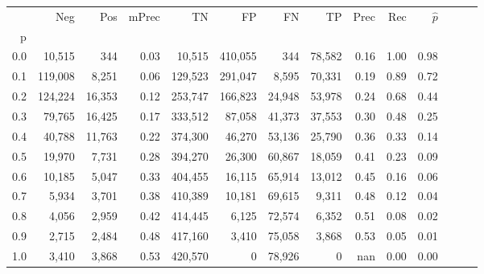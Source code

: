\begin{tabular}{rrrrrrrrrrrrrr}
\toprule
{} &      Neg &     Pos & mPrec &       TN &       FP &      FN &      TP &  Prec &   Rec & $\hat{p}$ \\
p   &          &         &       &          &          &         &         &       &       &           \\
\midrule
0.0 &   10,515 &     344 &  0.03 &   10,515 &  410,055 &     344 &  78,582 &  0.16 &  1.00 &      0.98 \\
0.1 &  119,008 &   8,251 &  0.06 &  129,523 &  291,047 &   8,595 &  70,331 &  0.19 &  0.89 &      0.72 \\
0.2 &  124,224 &  16,353 &  0.12 &  253,747 &  166,823 &  24,948 &  53,978 &  0.24 &  0.68 &      0.44 \\
0.3 &   79,765 &  16,425 &  0.17 &  333,512 &   87,058 &  41,373 &  37,553 &  0.30 &  0.48 &      0.25 \\
0.4 &   40,788 &  11,763 &  0.22 &  374,300 &   46,270 &  53,136 &  25,790 &  0.36 &  0.33 &      0.14 \\
0.5 &   19,970 &   7,731 &  0.28 &  394,270 &   26,300 &  60,867 &  18,059 &  0.41 &  0.23 &      0.09 \\
0.6 &   10,185 &   5,047 &  0.33 &  404,455 &   16,115 &  65,914 &  13,012 &  0.45 &  0.16 &      0.06 \\
0.7 &    5,934 &   3,701 &  0.38 &  410,389 &   10,181 &  69,615 &   9,311 &  0.48 &  0.12 &      0.04 \\
0.8 &    4,056 &   2,959 &  0.42 &  414,445 &    6,125 &  72,574 &   6,352 &  0.51 &  0.08 &      0.02 \\
0.9 &    2,715 &   2,484 &  0.48 &  417,160 &    3,410 &  75,058 &   3,868 &  0.53 &  0.05 &      0.01 \\
1.0 &    3,410 &   3,868 &  0.53 &  420,570 &        0 &  78,926 &       0 &   nan &  0.00 &      0.00 \\
\bottomrule
\end{tabular}
